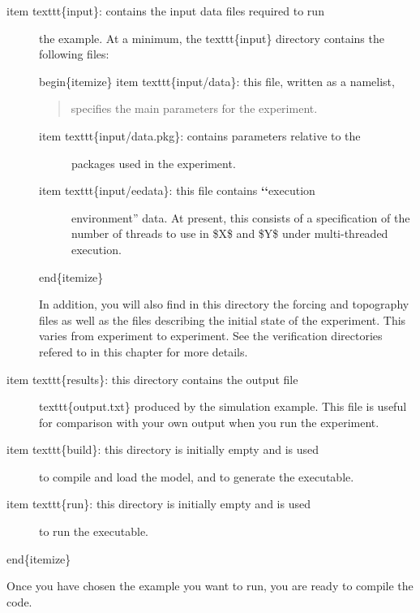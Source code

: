 \documentclass[letterpaper,10pt,english]{sphinxmanual}
\begin{document}
\begin{description}
\item[{item texttt\{input\}: contains the input data files required to run}] \leavevmode
the example. At a minimum, the texttt\{input\} directory contains the
following files:

begin\{itemize\}
item texttt\{input/data\}: this file, written as a namelist,
\begin{quote}

specifies the main parameters for the experiment.
\end{quote}
\begin{description}
\item[{item texttt\{input/data.pkg\}: contains parameters relative to the}] \leavevmode
packages used in the experiment.

\item[{item texttt\{input/eedata\}: this file contains {\color{red}\bfseries{}{}`{}`}execution}] \leavevmode
environment'' data. At present, this consists of a specification
of the number of threads to use in \$X\$ and \$Y\$ under multi-threaded
execution.

\end{description}

end\{itemize\}

In addition, you will also find in this directory the forcing and
topography files as well as the files describing the initial state
of the experiment.  This varies from experiment to experiment. See
the verification directories refered to in this chapter for more details.

\item[{item texttt\{results\}: this directory contains the output file}] \leavevmode
texttt\{output.txt\} produced by the simulation example. This file is
useful for comparison with your own output when you run the
experiment.

\item[{item texttt\{build\}: this directory is initially empty and is used}] \leavevmode
to compile and load the model, and to generate the executable.

\item[{item texttt\{run\}: this directory is initially empty and is used}] \leavevmode
to run the executable.

\end{description}

end\{itemize\}

Once you have chosen the example you want to run, you are ready to
compile the code.
\end{document}
